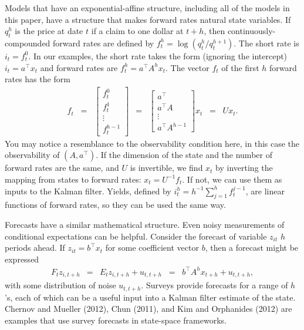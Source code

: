 \documentclass[12pt]{article}
\begin{document}
{Models that have an exponential-affine structure,
including all of the models in this paper,
have a structure that makes forward rates natural state variables.
If $q_t^h$ is the price at date $t$ if a claim to one dollar at $t+h$,
then continuously-compounded forward rates are defined by
$ f^h_t = \log (q^h_t/q^{h+1}_t)$.
The short rate is $i_t = f^0_t$.
In  our examples, the short rate takes the form (ignoring the intercept) $i_t = a^\top x_t$
and forward rates are $f^h_t = a^{\top} A^h x_t$.
The vector $f_t$ of the first $h$ forward rates has the form
\begin{eqnarray*}
    f_t  \;\;=\;\; \left[  \begin{array}{c} f^0_t \\ f^1_t \\ \vdots \\ f^{h-1}_t \end{array} \right]
        &=&
    \left[  \begin{array}{c} a^\top \\ a^\top A \\ \vdots \\ a^\top A^{h-1} \end{array} \right]
     x_t
    \;\;=\;\; U x_t .
\end{eqnarray*}
You may notice a resemblance to the observability condition here,
in this case the observability of $(A, a^\top)$.
If the dimension of the state and the number of forward rates are the same,
and $U$ is invertible,
we find $x_t$ by inverting the mapping from states to forward rates:  $x_t = U^{-1} f_t$.
If not, we can use them as inputs to the Kalman filter.
Yields, defined by $ i^h_t = h^{-1} \sum_{j=1}^h f^{j-1}_t $,
are linear functions of forward rates, so they can be used the same way.

Forecasts have a similar mathematical structure.
Even noisy measurements of conditional expectations can be helpful.
Consider the forecast of variable $z_{it}$ $h$ periods ahead.
If $ z_{it} = b^\top x_t$ for some coefficient vector $b$,
then a forecast might be expressed
\begin{eqnarray*}
    F_t z_{i,t+h}&=& E_t z_{i,t+h} + u_{t,t+h}
            \;\;=\;\; b^\top A^h x_{t+h} + u_{t,t+h},
\end{eqnarray*}
with some distribution of noise $u_{t,t+h}$.
Surveys provide forecasts for a range of $h$'s,
each of which can be a useful input into a Kalman filter estimate of the state.
Chernov and Mueller (2012), Chun (2011), and Kim and Orphanides (2012)
are examples that use survey forecasts in state-space frameworks.

}
\end{document}
